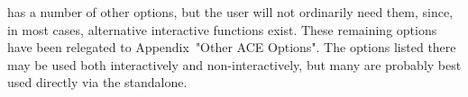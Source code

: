 \enditems


{\ACE} has a number of other options, but the  {\GAP}  user  will  not
ordinarily need them, since, in most  cases,  alternative  interactive
functions exist.  These  remaining  options  have  been  relegated  to
Appendix~"Other ACE Options". The options listed  there  may  be  used
both interactively and non-interactively, but many are  probably  best
used directly via the {\ACE} standalone.

